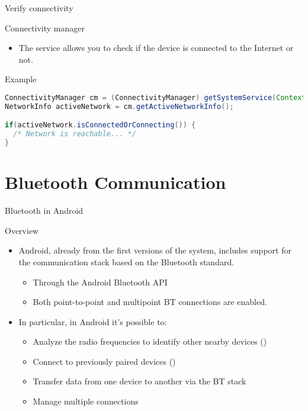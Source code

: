 \documentclass{beamer}
\begin{document}
  \begin{frame}[fragile]{Verify connectivity}
    \begin{block}{Connectivity manager}
      \begin{itemize}\itemsep20pt
        \item The  service allows you to check if the
        device is connected to the Internet or not.
      \end{itemize}
    \end{block}
    \begin{exampleblock}{Example}
      \begin{lstlisting}[language=Java]
ConnectivityManager cm = (ConnectivityManager) getSystemService(Context.CONNECTIVITY_SERVICE);
NetworkInfo activeNetwork = cm.getActiveNetworkInfo();

if(activeNetwork.isConnectedOrConnecting()) {
  /* Network is reachable... */
}
      \end{lstlisting}
    \end{exampleblock}
  \end{frame}


\section{Bluetooth Communication}

  \begin{frame}{Bluetooth in Android}
    \begin{block}{Overview}
      \begin{itemize}\itemsep10pt
        \item Android, already from the first versions of the system, includes
        support for the communication stack based on the Bluetooth standard.
        \begin{itemize}
          \item Through the Android Bluetooth API
          \item Both point-to-point and multipoint BT connections are enabled. 
        \end{itemize}
        \item In particular, in Android it's possible to:
        \begin{itemize}
          \item Analyze the radio frequencies to identify other nearby devices
          ()
          \item Connect to previously paired devices ()
          \item Transfer data from one device to another via the BT stack
          \item Manage multiple connections
        \end{itemize}
      \end{itemize}
    \end{block}
  \end{frame}
\end{document}
